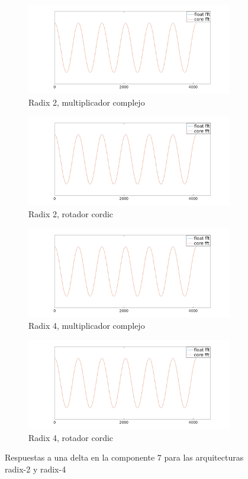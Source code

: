 \begin{figure}[htbp!]
        \advance\leftskip-1.5cm
        \begin{subfigure}{0.6\textwidth}
        \includegraphics[width=9cm]{./figures/r2_delta7_16_4096_mul.png}
        \caption{Radix 2, multiplicador complejo}
        \end{subfigure}%
        \begin{subfigure}{0.6\textwidth}%
        \includegraphics[width=9cm]{./figures/r2_delta7_16_4096_cor.png}
        \caption{Radix 2, rotador cordic}
        \end{subfigure} 
        \begin{subfigure}{0.6\textwidth}%
        \includegraphics[width=9cm]{./figures/r4_delta7_16_4096_mul.png}
        \caption{Radix 4, multiplicador complejo}
        \end{subfigure}%
        \begin{subfigure}{0.6\textwidth}%
        \includegraphics[width=9cm]{./figures/r4_delta7_16_4096_cor.png}
        \caption{Radix 4, rotador cordic}
        \end{subfigure}
        \caption{Respuestas a una delta en la componente $7$ para las arquitecturas radix-2 y
        radix-4}
        \label{fig:outDelta7}
\end{figure}

